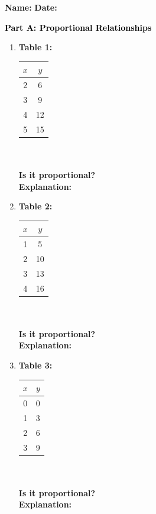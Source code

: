 \documentclass[12pt, letterpaper, fleqn]{article}
\newcommand{\blank}{\underline{\hspace{2.2cm}}}
\begin{document}
\textbf{Name:} \underline{\hspace{5cm}}
\hfill
\textbf{Date:} \underline{\hspace{3cm}}\\

\begin{tcolorbox}[colback=customteal!20]
\large\textcolor{black}{\textbf{Part A: Proportional Relationships}}
\end{tcolorbox}

\vspace{3mm}

\begin{enumerate}[itemsep=5.5cm, leftmargin=0.6cm]
\item \textbf{Table 1:}
\begin{tabular}{|c|c|}
\hline
$x$ & $y$ \\
\hline
2 & 6 \\
3 & 9 \\
4 & 12 \\
5 & 15 \\
\hline
\end{tabular}
\newline \\ \\
\textbf{Is it proportional?} \blank
\newline \\
\textbf{Explanation:}
\item \textbf{Table 2:}
\begin{tabular}{|c|c|}
\hline
$x$ & $y$ \\
\hline
1 & 5 \\
2 & 10 \\
3 & 13 \\
4 & 16 \\
\hline
\end{tabular}
\newline \\ \\
\textbf{Is it proportional?} \blank
\newline \\
\textbf{Explanation:}
\item \textbf{Table 3:}
\begin{tabular}{|c|c|}
\hline
$x$ & $y$ \\
\hline
0 & 0 \\
1 & 3 \\
2 & 6 \\
3 & 9 \\
\hline
\end{tabular}
\newline \\ \\
\textbf{Is it proportional?} \blank
\newline \\
\textbf{Explanation:}
\end{enumerate}
\end{document}
